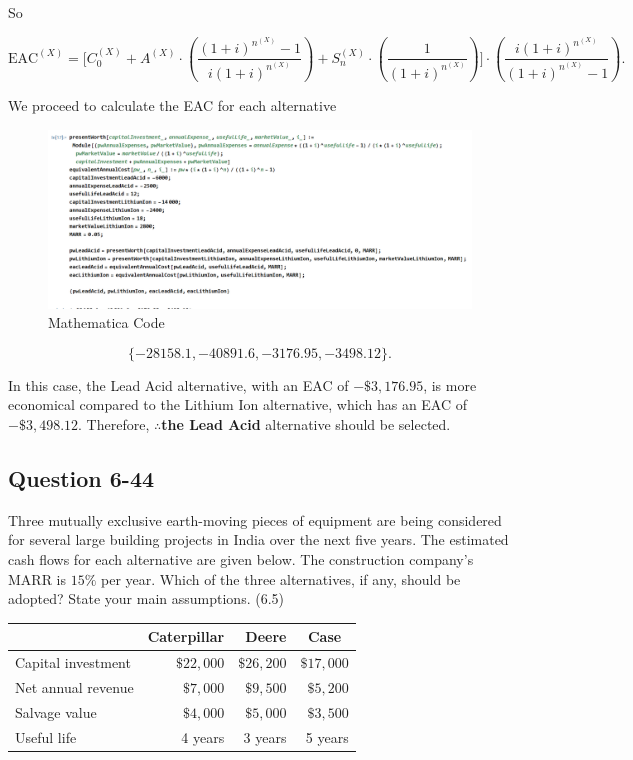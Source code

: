 \documentclass[12pt]{article}
\begin{document}
So

\[\text{EAC}^{(X)} = \Bigg[ C_0^{(X)} + A^{(X)} \cdot \left( \frac{(1 + i)^{n^{(X)}} - 1}{i(1 + i)^{n^{(X)}}} \right) + S_n^{(X)} \cdot \left( \frac{1}{(1 + i)^{n^{(X)}}} \right)\Bigg] \cdot \left( \frac{i(1 + i)^{n^{(X)}}}{(1 + i)^{n^{(X)}} - 1} \right). \]

We proceed to calculate the EAC for each alternative

\begin{figure}[!ht]
    \centering
    \includegraphics[width=\textwidth]{Screenshot 2023-11-26 201053.png}
    \caption{Mathematica Code}
    \label{fig:enter-label}
\end{figure}

\[\{-28158.1,-40891.6,-3176.95,-3498.12\}.\]

In this case, the Lead Acid alternative, with an EAC of \(-\$3,176.95\), is more economical compared to the Lithium Ion alternative, which has an EAC of \(-\$3,498.12\). Therefore, \(\therefore\)\textbf{the Lead Acid} alternative should be selected.

\newpage
\subsection*{Question 6-44}
\begin{q}
Three mutually exclusive earth-moving pieces of equipment are being considered for several large building projects in India over the next five years. The estimated cash flows for each alternative are given below. The construction company's MARR is \(15 \%\) per year. Which of the three alternatives, if any, should be adopted? State your main assumptions. (6.5)
\begin{center}
\begin{tabular}{lrrr}
\hline & Caterpillar & Deere & \multicolumn{1}{c}{ Case } \\
\hline Capital investment & \(\$ 22,000\) & \(\$ 26,200\) & \(\$ 17,000\) \\
Net annual revenue & \(\$ 7,000\) & \(\$ 9,500\) & \(\$ 5,200\) \\
Salvage value & \(\$ 4,000\) & \(\$ 5,000\) & \(\$ 3,500\) \\
Useful life & 4 years & 3 years & 5 years \\
\hline
\end{tabular}
\end{center}
\end{q}
\end{document}
